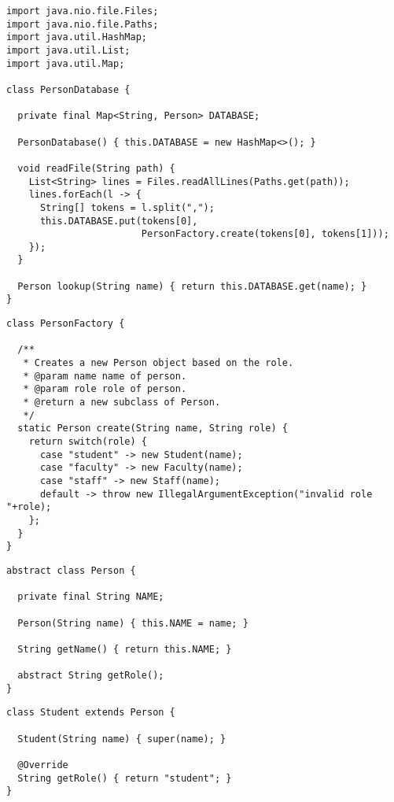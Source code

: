 \enlargethispage{-4\baselineskip}
\begin{lstlisting}[language=MyJava]
import java.nio.file.Files;
import java.nio.file.Paths;
import java.util.HashMap;
import java.util.List;
import java.util.Map;

class PersonDatabase {

  private final Map<String, Person> DATABASE;

  PersonDatabase() { this.DATABASE = new HashMap<>(); }

  void readFile(String path) {
    List<String> lines = Files.readAllLines(Paths.get(path));
    lines.forEach(l -> {
      String[] tokens = l.split(",");
      this.DATABASE.put(tokens[0], 
                        PersonFactory.create(tokens[0], tokens[1]));
    });
  }

  Person lookup(String name) { return this.DATABASE.get(name); }
}
\end{lstlisting}

\begin{lstlisting}[language=MyJava]
class PersonFactory {
  
  /**
   * Creates a new Person object based on the role.
   * @param name name of person.
   * @param role role of person.
   * @return a new subclass of Person.
   */
  static Person create(String name, String role) {
    return switch(role) {
      case "student" -> new Student(name);
      case "faculty" -> new Faculty(name);
      case "staff" -> new Staff(name);
      default -> throw new IllegalArgumentException("invalid role "+role);
    };
  }
}
\end{lstlisting}

\enlargethispage{1\baselineskip}
\begin{lstlisting}[language=MyJava]
abstract class Person {

  private final String NAME;

  Person(String name) { this.NAME = name; }

  String getName() { return this.NAME; }

  abstract String getRole();
}
\end{lstlisting}

\begin{lstlisting}[language=MyJava]
class Student extends Person {

  Student(String name) { super(name); }

  @Override
  String getRole() { return "student"; }
}
\end{lstlisting}

